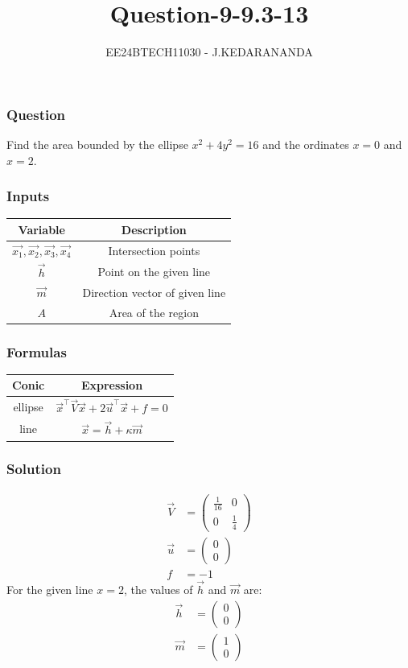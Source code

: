 \documentclass{beamer}
\title{Question-9-9.3-13}
\author{EE24BTECH11030 - J.KEDARANANDA}
\date{}
\begin{document}
\frame{\titlepage}

\begin{frame}
\frametitle{Question}
Find the area bounded by the ellipse $x^2 + 4y^2 = 16$ and the ordinates $x = 0$ and $x = 2$.
\end{frame}

\begin{frame}
\frametitle{Inputs}

\centering
\begin{tabular}{ |c|c|}
    \hline
    \textbf{Variable} & \textbf{Description}\\ 
    \hline
    $\vec{x_1},\vec{x_2},\vec{x_3},\vec{x_4}$ & Intersection points\\
    \hline
    $\vec{h}$ & Point on the given line\\
    \hline
    $\vec{m}$ & Direction vector of given line\\
    \hline
    $A$ & Area of the region\\
    \hline
\end{tabular}
\end{frame}

\begin{frame}
\frametitle{Formulas}
\centering
\begin{tabular}{ |c|c|}
    \hline
    \textbf{Conic} & \textbf{Expression}\\ 
    \hline
    ellipse & $\vec{x}^\top\vec{V}\vec{x} + 2\vec{u}^\top\vec{x} + f = 0$\\
    \hline
    line & $\vec{x}=\vec{h}+\kappa\vec{m}$\\
    \hline
\end{tabular}
\end{frame}

\begin{frame}
\frametitle{Solution}
\begin{align}
\vec{V}&=\begin{pmatrix}\frac{1}{16} & 0\\0 & \frac{1}{4}\end{pmatrix}\\
\vec{u}&=\begin{pmatrix}0\\0\end{pmatrix}\\
f&=-1
\end{align}
For the given line $x=2$, the values of $\vec{h}$ and $\vec{m}$ are:
\begin{align}
\vec{h}&=\begin{pmatrix}0\\0\end{pmatrix}\\
\vec{m}&=\begin{pmatrix}1\\0\end{pmatrix}
\end{align}
\end{frame}
\end{document}
